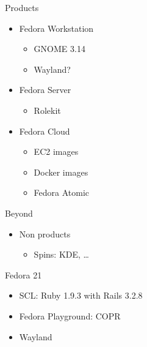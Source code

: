 \begin{frame}{Products}
  \begin{itemize}
    \item Fedora Workstation
      \begin{itemize}
        \item GNOME 3.14
        \item Wayland?
      \end{itemize}
    \item Fedora Server
      \begin{itemize}
        \item Rolekit
      \end{itemize}
    \item Fedora Cloud
      \begin{itemize}
        \item EC2 images
        \item Docker images
        \item Fedora Atomic
      \end{itemize}
  \end{itemize}
\end{frame}

\begin{frame}{Beyond}
  \begin{itemize}
    \item Non products
      \begin{itemize}
        \item Spins: KDE, \ldots
      \end{itemize}
  \end{itemize}
\end{frame}

\begin{frame}{Fedora 21}
  \begin{itemize}
    \item SCL: Ruby 1.9.3 with Rails 3.2.8
    \item Fedora Playground: COPR
    \item Wayland
  \end{itemize}
\end{frame}
